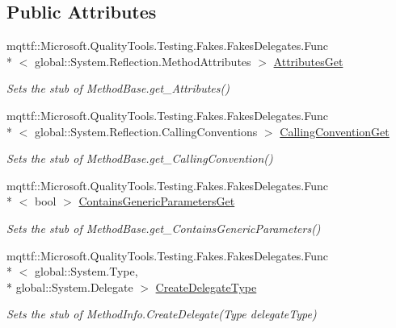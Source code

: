 \subsection*{Public Attributes}
\begin{DoxyCompactItemize}
\item 
mqttf\-::\-Microsoft.\-Quality\-Tools.\-Testing.\-Fakes.\-Fakes\-Delegates.\-Func\\*
$<$ global\-::\-System.\-Reflection.\-Method\-Attributes $>$ \hyperlink{class_system_1_1_reflection_1_1_fakes_1_1_stub_method_info_a385d8aff8fb60de72c819e4285fc7fe0}{Attributes\-Get}
\begin{DoxyCompactList}\small\item\em Sets the stub of Method\-Base.\-get\-\_\-\-Attributes()\end{DoxyCompactList}\item 
mqttf\-::\-Microsoft.\-Quality\-Tools.\-Testing.\-Fakes.\-Fakes\-Delegates.\-Func\\*
$<$ global\-::\-System.\-Reflection.\-Calling\-Conventions $>$ \hyperlink{class_system_1_1_reflection_1_1_fakes_1_1_stub_method_info_a3d2500b35a61d45ce73fcb0668e3b85f}{Calling\-Convention\-Get}
\begin{DoxyCompactList}\small\item\em Sets the stub of Method\-Base.\-get\-\_\-\-Calling\-Convention()\end{DoxyCompactList}\item 
mqttf\-::\-Microsoft.\-Quality\-Tools.\-Testing.\-Fakes.\-Fakes\-Delegates.\-Func\\*
$<$ bool $>$ \hyperlink{class_system_1_1_reflection_1_1_fakes_1_1_stub_method_info_af2eaee42ba9dfb1b733d7a763ba8f3f9}{Contains\-Generic\-Parameters\-Get}
\begin{DoxyCompactList}\small\item\em Sets the stub of Method\-Base.\-get\-\_\-\-Contains\-Generic\-Parameters()\end{DoxyCompactList}\item 
mqttf\-::\-Microsoft.\-Quality\-Tools.\-Testing.\-Fakes.\-Fakes\-Delegates.\-Func\\*
$<$ global\-::\-System.\-Type, \\*
global\-::\-System.\-Delegate $>$ \hyperlink{class_system_1_1_reflection_1_1_fakes_1_1_stub_method_info_a87bcea29fb3d02ba6893154792eac71f}{Create\-Delegate\-Type}
\begin{DoxyCompactList}\small\item\em Sets the stub of Method\-Info.\-Create\-Delegate(\-Type delegate\-Type)\end{DoxyCompactList}\item 

\end{DoxyCompactItemize}
